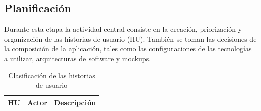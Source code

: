 ﻿\documentclass{iccmemoria}
\begin{document}
\subsection{Planificación}
Durante esta etapa la actividad central consiste en la creación, priorización y organización de las historias de usuario (HU). También se toman las decisiones de la composición de la aplicación, tales como las configuraciones de las tecnologías a utilizar, arquitecturas de software y mockups.\\
\begin{table}[H]
    \centering
    \caption{Clasificación de las historias de usuario}
    \label{tab:Clasificación_historias_de_usuario} 
    
    \begin{tabular}{|p{}|p{2cm}|p{11cm}|} 
        \hline %
        
        \textbf{HU} & \textbf{Actor} & \textbf{Descripción}\\
        \hline %
        

\end{tabular}
\end{table}
\end{document}
